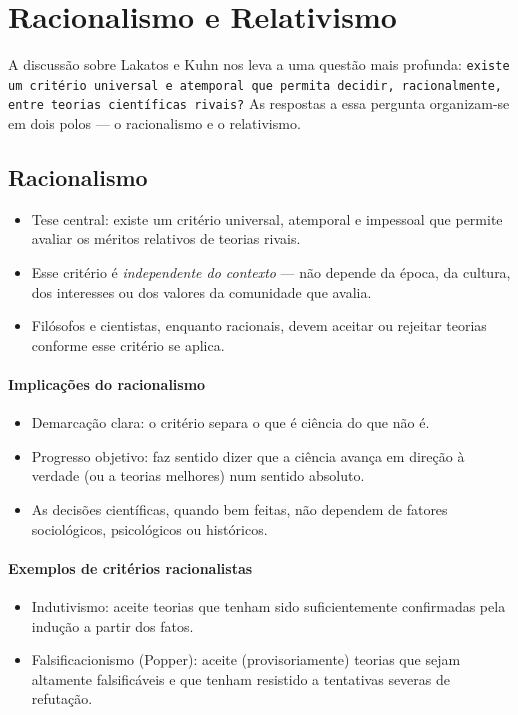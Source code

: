 \documentclass[9pt,a4paper]{extarticle}
\newcommand{\impt}[1]{\textcolor{important}{#1}}
\newcommand{\ntc}[1]{\textcolor{notice}{#1}}
\begin{document}
\section{Racionalismo e Relativismo}

A discussão sobre Lakatos e Kuhn nos leva a uma questão mais profunda: \texttt{existe um critério universal e atemporal que permita decidir, racionalmente, entre teorias científicas rivais?} As respostas a essa pergunta organizam-se em dois polos --- o racionalismo e o relativismo.

\subsection{Racionalismo}

\begin{itemize}
    \item \ntc{Tese central}: existe um \impt{critério universal, atemporal e impessoal} que permite avaliar os méritos relativos de teorias rivais.
    \item Esse critério é \emph{independente do contexto} --- não depende da época, da cultura, dos interesses ou dos valores da comunidade que avalia.
    \item Filósofos e cientistas, enquanto racionais, devem aceitar ou rejeitar teorias conforme esse critério se aplica.
\end{itemize}

\paragraph{Implicações do racionalismo}
\begin{itemize}
    \item \impt{Demarcação clara}: o critério separa o que é ciência do que não é.
    \item \impt{Progresso objetivo}: faz sentido dizer que a ciência avança em direção à verdade (ou a teorias melhores) num sentido absoluto.
    \item As decisões científicas, quando bem feitas, não dependem de fatores sociológicos, psicológicos ou históricos.
\end{itemize}

\paragraph{Exemplos de critérios racionalistas}
\begin{itemize}
    \item \ntc{Indutivismo}: aceite teorias que tenham sido suficientemente confirmadas pela indução a partir dos fatos.
    \item \ntc{Falsificacionismo (Popper)}: aceite (provisoriamente) teorias que sejam altamente falsificáveis e que tenham resistido a tentativas severas de refutação.
\end{itemize}
\end{document}
